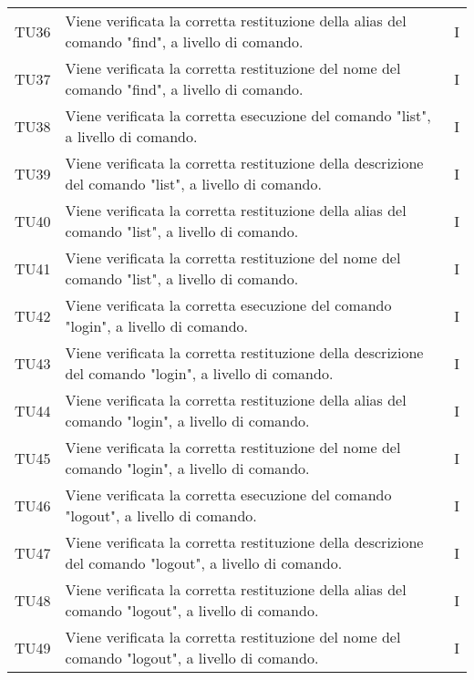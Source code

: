 \begin{longtable}{|C{1.5cm}|C{10cm}|C{1.5cm}|}
	TU36 &
	Viene verificata la corretta restituzione della alias del comando "find", a livello di comando.  &
	I \\

	TU37 &
	Viene verificata la corretta restituzione del nome del comando "find", a livello di comando.  &
	I \\

	TU38 &
	Viene verificata la corretta esecuzione del comando "list", a livello di comando.  &
	I \\

	TU39 &
	Viene verificata la corretta restituzione della descrizione del comando "list", a livello di comando.  &
	I \\

	TU40 &
	Viene verificata la corretta restituzione della alias del comando "list", a livello di comando.  &
	I \\

	TU41 &
	Viene verificata la corretta restituzione del nome del comando "list", a livello di comando.  &
	I \\

	TU42 &
	Viene verificata la corretta esecuzione del comando "login", a livello di comando.  &
	I \\

	TU43 &
	Viene verificata la corretta restituzione della descrizione del comando "login", a livello di comando.  &
	I \\

	TU44 &
	Viene verificata la corretta restituzione della alias del comando "login", a livello di comando.  &
	I \\

	TU45 &
	Viene verificata la corretta restituzione del nome del comando "login", a livello di comando.  &
	I \\

	TU46 &
	Viene verificata la corretta esecuzione del comando "logout", a livello di comando.  &
	I \\

	TU47 &
	Viene verificata la corretta restituzione della descrizione del comando "logout", a livello di comando.  &
	I \\

	TU48 &
	Viene verificata la corretta restituzione della alias del comando "logout", a livello di comando.  &
	I \\

	TU49 &
	Viene verificata la corretta restituzione del nome del comando "logout", a livello di comando.  &
	I \\


\end{longtable}
